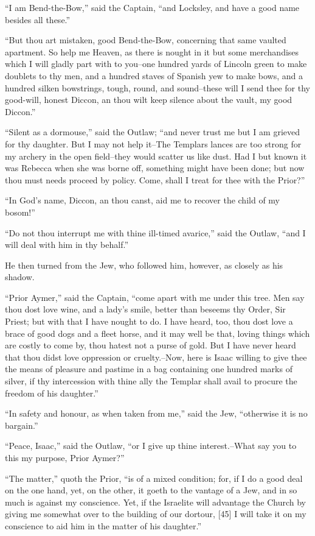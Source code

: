 ``I am Bend-the-Bow,'' said the Captain, ``and Locksley, and have a good
name besides all these.''

``But thou art mistaken, good Bend-the-Bow, concerning that same vaulted
apartment. So help me Heaven, as there is nought in it but some
merchandises which I will gladly part with to you--one hundred yards of
Lincoln green to make doublets to thy men, and a hundred staves of
Spanish yew to make bows, and a hundred silken bowstrings, tough, round,
and sound--these will I send thee for thy good-will, honest Diccon, an
thou wilt keep silence about the vault, my good Diccon.''

``Silent as a dormouse,'' said the Outlaw; ``and never trust me but I am
grieved for thy daughter. But I may not help it--The Templars lances are
too strong for my archery in the open field--they would scatter us like
dust. Had I but known it was Rebecca when she was borne off, something
might have been done; but now thou must needs proceed by policy. Come,
shall I treat for thee with the Prior?''

``In God's name, Diccon, an thou canst, aid me to recover the child of
my bosom!''

``Do not thou interrupt me with thine ill-timed avarice,'' said the
Outlaw, ``and I will deal with him in thy behalf.''

He then turned from the Jew, who followed him, however, as closely as
his shadow.

``Prior Aymer,'' said the Captain, ``come apart with me under this tree.
Men say thou dost love wine, and a lady's smile, better than beseems thy
Order, Sir Priest; but with that I have nought to do. I have heard, too,
thou dost love a brace of good dogs and a fleet horse, and it may well
be that, loving things which are costly to come by, thou hatest not a
purse of gold. But I have never heard that thou didst love oppression or
cruelty.--Now, here is Isaac willing to give thee the means of pleasure
and pastime in a bag containing one hundred marks of silver, if thy
intercession with thine ally the Templar shall avail to procure the
freedom of his daughter.''

``In safety and honour, as when taken from me,'' said the Jew,
``otherwise it is no bargain.''

``Peace, Isaac,'' said the Outlaw, ``or I give up thine interest.--What
say you to this my purpose, Prior Aymer?''

``The matter,'' quoth the Prior, ``is of a mixed condition; for, if I do
a good deal on the one hand, yet, on the other, it goeth to the vantage
of a Jew, and in so much is against my conscience. Yet, if the Israelite
will advantage the Church by giving me somewhat over to the building of
our dortour, {[}45{]} I will take it on my conscience to aid him in the
matter of his daughter.''

